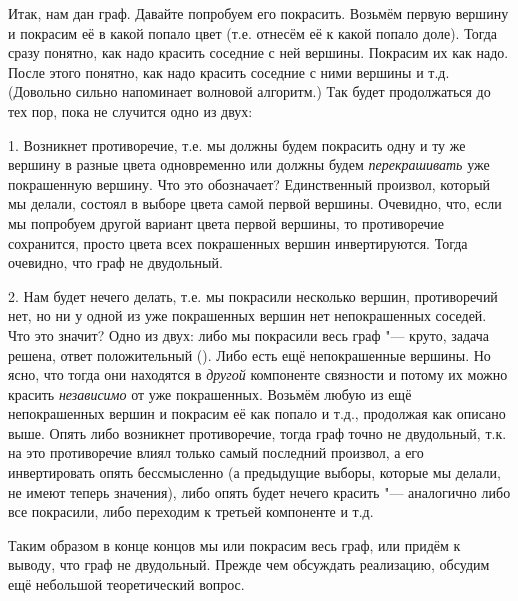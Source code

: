 
Итак, нам дан граф. Давайте попробуем его покрасить. Возьмём первую вершину и покрасим её в какой 
попало цвет (т.е. отнесём её к какой попало доле). Тогда сразу понятно, как надо красить соседние с 
ней вершины. Покрасим их как надо. После этого понятно, как надо красить соседние с ними вершины и 
т.д. (Довольно сильно напоминает волновой алгоритм.) Так будет продолжаться до тех пор, пока не 
случится одно из двух:

1. Возникнет противоречие, т.е. мы должны будем покрасить одну и ту же вершину в разные цвета 
одновременно или должны будем \textit{перекрашивать} уже покрашенную вершину. Что это обозначает? 
Единственный произвол, который мы делали, состоял в выборе цвета самой первой вершины. Очевидно, 
что, если мы попробуем другой вариант цвета первой вершины, то противоречие сохранится, просто 
цвета всех покрашенных вершин инвертируются. Тогда очевидно, что граф не двудольный.

2. Нам будет нечего делать, т.е. мы покрасили несколько вершин, противоречий нет, но ни у одной из 
уже покрашенных вершин нет непокрашенных соседей. Что это значит? Одно из двух: либо мы покрасили 
весь граф "--- круто, задача решена, ответ положительный ().  Либо есть ещё непокрашенные вершины. Но ясно, что тогда они находятся в 
\textit{другой} компоненте связности и потому их можно красить \textit{независимо} от уже 
покрашенных. Возьмём любую из ещё непокрашенных вершин и покрасим её как попало и т.д., продолжая 
как описано выше. Опять либо возникнет противоречие, тогда граф точно не двудольный, т.к. на это 
противоречие влиял только самый последний произвол, а его инвертировать опять бессмысленно (а 
предыдущие выборы, которые мы делали, не имеют теперь значения), либо опять будет нечего красить 
"--- аналогично либо все покрасили, либо переходим к третьей компоненте и т.д.

Таким образом в конце концов мы или покрасим весь граф, или придём к выводу, что граф не 
двудольный. Прежде чем обсуждать реализацию, обсудим ещё небольшой теоретический вопрос.

